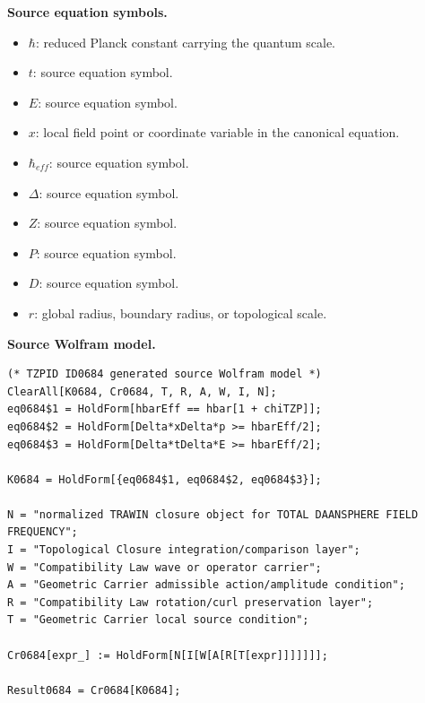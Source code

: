 \begin{minipage}[t]{0.49\linewidth}
\begingroup
\small
\raggedright
\textbf{Source equation symbols.}\par
\begin{itemize}[leftmargin=1.35em,itemsep=1pt,topsep=1pt,parsep=0pt]
    \item $\hbar$: reduced Planck constant carrying the quantum scale.
    \item $t$: source equation symbol.
    \item $E$: source equation symbol.
    \item $x$: local field point or coordinate variable in the canonical equation.
    \item $\hbar_{eff}$: source equation symbol.
    \item $\Delta$: source equation symbol.
    \item $Z$: source equation symbol.
    \item $P$: source equation symbol.
    \item $D$: source equation symbol.
    \item $r$: global radius, boundary radius, or topological scale.
\end{itemize}
\endgroup
\end{minipage}\hfill
\begin{minipage}[t]{0.47\linewidth}
\begingroup
\scriptsize
\raggedright
\textbf{Source Wolfram model.}\par
\begin{Verbatim}[fontsize=\tiny,breaklines=true,breakanywhere=true]
(* TZPID ID0684 generated source Wolfram model *)
ClearAll[K0684, Cr0684, T, R, A, W, I, N];
eq0684$1 = HoldForm[hbarEff == hbar[1 + chiTZP]];
eq0684$2 = HoldForm[Delta*xDelta*p >= hbarEff/2];
eq0684$3 = HoldForm[Delta*tDelta*E >= hbarEff/2];

K0684 = HoldForm[{eq0684$1, eq0684$2, eq0684$3}];

N = "normalized TRAWIN closure object for TOTAL DAANSPHERE FIELD FREQUENCY";
I = "Topological Closure integration/comparison layer";
W = "Compatibility Law wave or operator carrier";
A = "Geometric Carrier admissible action/amplitude condition";
R = "Compatibility Law rotation/curl preservation layer";
T = "Geometric Carrier local source condition";

Cr0684[expr_] := HoldForm[N[I[W[A[R[T[expr]]]]]]];

Result0684 = Cr0684[K0684];
\end{Verbatim}
\endgroup
\end{minipage}

